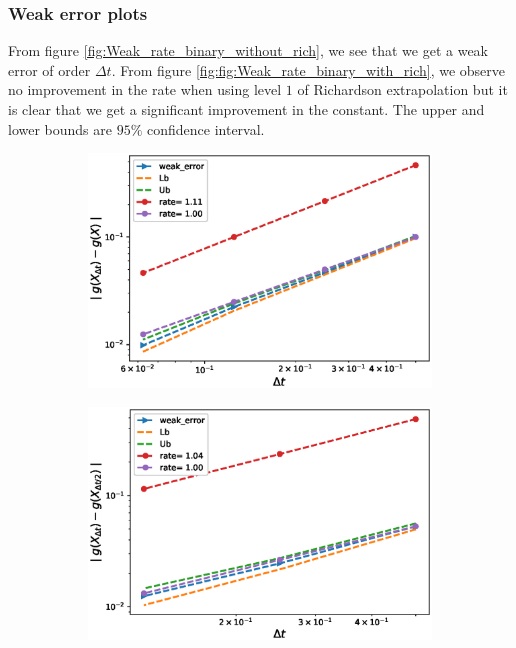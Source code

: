 \documentclass[11pt]{article}
\begin{document}
\newpage
\subsubsection{Weak error plots} \label{sec:Weak error plots_binary}

From figure \ref{fig:Weak_rate_binary_without_rich}, we see that we get a weak error of order $\Delta t$. From figure \ref{fig:fig:Weak_rate_binary_with_rich}, we observe no improvement in the rate when using level $1$ of Richardson extrapolation but it is clear that we get a significant improvement in the constant. The upper and lower bounds are $95\%$ confidence interval.


\begin{figure}[h!]
	\centering
	\begin{subfigure}{.4\textwidth}
		\centering
		\includegraphics[width=1\linewidth]{./figures/binary_weak_error/without_richardson/weak_convergence_order_binary_option_relative}
		\caption{}
		\label{fig:sub3}
	\end{subfigure}%
	\begin{subfigure}{.4\textwidth}
		\centering
		\includegraphics[width=1\linewidth]{./figures/binary_weak_error/without_richardson/weak_convergence_order_differences_binary_option_relative}
		\caption{}
		\label{fig:sub4}
	\end{subfigure}
	

\end{figure}
\end{document}
